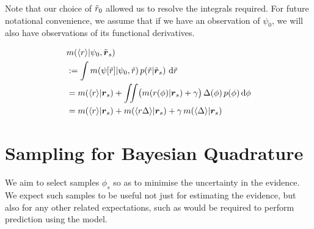 \documentclass{article}
\begin{document}
Note that our choice of $\tr_0$ allowed us to resolve the integrals required. For future notational convenience, we assume that if we have an observation of $\psi_0$, we will also have observations of its functional derivatives.

\begin{align*}
& \mean{\inty{r}}{\psi_0,\tvr_s} \\
& \deq \int \mean{\psi[\tr]}{\psi_0,\tr}
\p{\tr}{\tvr_s}\, \ud \tr 
\\
& = \mean{\inty{r}}{\vr_s} + \iint \bigl(\mean{r(\phi)}{\vr_s}+\gamma\bigr)\,\Delta(\phi)\,\po{\phi}\ud\phi
\\
& = \mean{\inty{r}}{\vr_s} + \mean{\inty{r \Delta}}{\vr_s} + \gamma\, \mean{\inty{ \Delta}}{\vr_s}
\end{align*}

\section{Sampling for Bayesian Quadrature}

We aim to select samples $\phi_s$ so as to minimise the uncertainty in the evidence. We expect such samples to be useful not just for estimating the evidence, but also for any other related expectations, such as would be required to perform prediction using the model.
\end{document}
